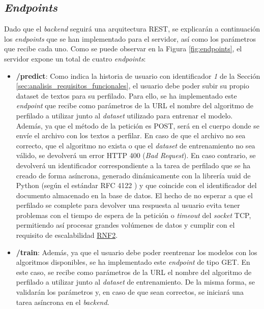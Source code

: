\subsection{\textit{Endpoints}}

Dado que el \textit{backend} seguirá una arquitectura REST, se explicarán a continuación los \textit{endpoints} que se han implementado para el servidor, así como los parámetros
que recibe cada uno. Como se puede observar en la Figura \ref{fig:endpoints}, el servidor expone un total de cuatro \textit{endpoints}:

\begin{itemize}
	\item \textbf{/predict}: Como indica la historia de usuario con identificador \textit{1} de la Sección \ref{sec:analisis_requisitos_funcionales}, el usuario
	      debe poder subir su propio dataset de textos para su perfilado. Para ello, se ha implementado este \textit{endpoint} que recibe como parámetros de la URL el
	      nombre del algoritmo de perfilado a utilizar junto al \textit{dataset} utilizado para entrenar el modelo. Además, ya que el método de la petición es POST,
	      será en el cuerpo donde se envíe
	      el archivo con los textos a perfilar. En caso de que el archivo no sea correcto, que el algoritmo no exista o que el \textit{dataset} de entrenamiento
	      no sea válido, se devolverá un error HTTP 400 (\textit{Bad Request}). En caso contrario, se devolverá un identificador correspondiente a la tarea de perfilado
	      que se ha creado de forma asíncrona, generado dinámicamente con la librería uuid \cite{uuidpython} de Python (según el estándar RFC 4122 \cite{rfc4122}) y que coincide
	      con el identificador del documento almacenado en la base de datos.
	      El hecho de no esperar a que el perfilado se complete
	      para devolver una respuesta al usuario evita tener problemas con el tiempo de espera de la petición o \textit{timeout} del \textit{socket} TCP,
	      permitiendo así procesar grandes volúmenes de datos y cumplir con el requisito de escalabilidad \hyperref[req:rnf2]{RNF2}.

	\item \textbf{/train}: Además, ya que el usuario debe poder reentrenar los modelos con los algoritmos disponibles, se ha implementado este \textit{endpoint} de tipo GET.
	      En este caso, se recibe como parámetros de la URL el nombre del algoritmo de perfilado a utilizar junto al \textit{dataset} de entrenamiento. De la misma forma,
	      se validarán los parámetros y, en caso de que sean correctos, se iniciará una tarea asíncrona en el \textit{backend}.


\end{itemize}
